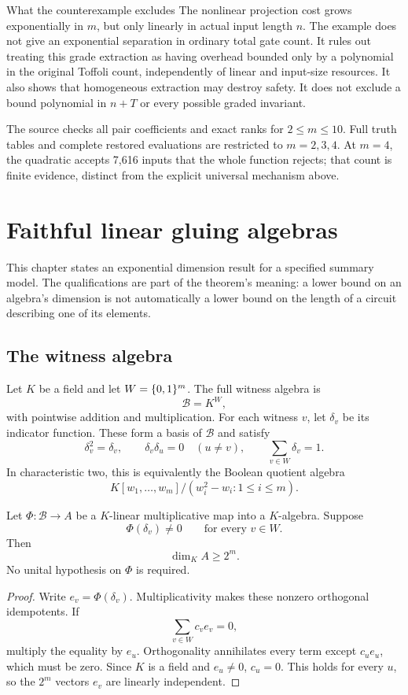 \begin{circuitscopebox}{What the counterexample excludes}
The nonlinear projection cost grows exponentially in $m$, but only linearly in actual input length $n$. The example does not give an exponential separation in ordinary total gate count. It rules out treating this grade extraction as having overhead bounded only by a polynomial in the original Toffoli count, independently of linear and input-size resources. It also shows that homogeneous extraction may destroy safety. It does not exclude a bound polynomial in $n+T$ or every possible graded invariant.
\end{circuitscopebox}
The source checks all pair coefficients and exact ranks for $2\le m\le10$. Full truth tables and complete restored evaluations are restricted to $m=2,3,4$. At $m=4$, the quadratic accepts 7,616 inputs that the whole function rejects; that count is finite evidence, distinct from the explicit universal mechanism above.

\chapter{Faithful linear gluing algebras}
\label{c:ch:gluing}
This chapter states an exponential dimension result for a specified summary model. The qualifications are part of the theorem's meaning: a lower bound on an algebra's dimension is not automatically a lower bound on the length of a circuit describing one of its elements.

\section{The witness algebra}
Let $K$ be a field and let $W=\{0,1\}^m$. The full witness algebra is
\[
 \mathcal B=K^W,
\]
with pointwise addition and multiplication. For each witness $v$, let $\delta_v$ be its indicator function. These form a basis of $\mathcal B$ and satisfy
\[
 \delta_v^2=\delta_v,\qquad
 \delta_v\delta_u=0\quad(u\ne v),\qquad
 \sum_{v\in W}\delta_v=1.
\]
In characteristic two, this is equivalently the Boolean quotient algebra
\[
 K[w_1,\ldots,w_m]/(w_i^2-w_i:1\le i\le m).
\]

\begin{theorem}\label{c:thm:gluing-dim}
Let $\Phi:\mathcal B\to A$ be a $K$-linear multiplicative map into a $K$-algebra. Suppose
\[
 \Phi(\delta_v)\ne0\qquad\text{for every }v\in W.
\]
Then
\[
 \dim_K A\ge2^m.
\]
No unital hypothesis on $\Phi$ is required.
\end{theorem}
\begin{proof}
Write $e_v=\Phi(\delta_v)$. Multiplicativity makes these nonzero orthogonal idempotents. If
\[
 \sum_{v\in W}c_ve_v=0,
\]
multiply the equality by $e_u$. Orthogonality annihilates every term except $c_ue_u$, which must be zero. Since $K$ is a field and $e_u\ne0$, $c_u=0$. This holds for every $u$, so the $2^m$ vectors $e_v$ are linearly independent.
\end{proof}

